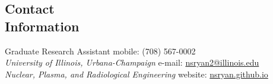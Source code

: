 \documentclass[margin,line]{resume}
\begin{document}
\begin{resume}

%


    \section{\mysidestyle Contact\\Information}
    Graduate Research Assistant \hfill mobile: (708) 567-0002 \vspace{0mm}\\\vspace{0mm}%
        \textsl{University of Illinois, Urbana-Champaign}
        \hfill e-mail: \href{mailto:nsryan2@illinois.edu}{nsryan2@illinois.edu}       \vspace{0mm}\\\vspace{0mm}%
    \textsl{Nuclear, Plasma, and Radiological Engineering}
        \hfill website: \href{https://nsryan.github.io}{nsryan.github.io}     \vspace{0mm}\\\vspace{0mm}%


\end{resume}
\end{document}
